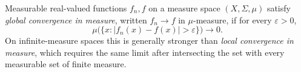 
Measurable real-valued functions $f_n,f$ on a measure space $(X,\Sigma,\mu)$ satisfy \emph{global convergence in measure}, written $f_n\to f$ in $\mu$-measure, if for every $\varepsilon>0$,
\[
\mu\bigl(\{x:|f_n(x)-f(x)|>\varepsilon\}\bigr)\longrightarrow0.
\]
On infinite-measure spaces this is generally stronger than \emph{local convergence in measure}, which requires the same limit after intersecting the set with every measurable set of finite measure.
